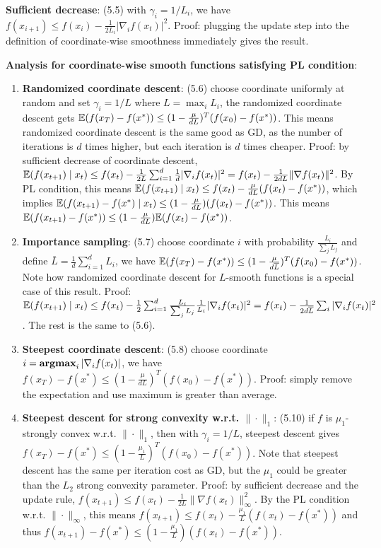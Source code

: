 \textbf{Sufficient decrease}: (5.5) with $\gamma_i = 1 / L_i$, we have $f(x_{i+1}) \le f(x_i) - \frac{1}{2L_i} |\nabla_i f(x_t)|^2$. Proof: plugging the update step into the definition of coordinate-wise smoothness immediately gives the result.

\textbf{Analysis for coordinate-wise smooth functions satisfying PL condition}:
\begin{enumerate}
    \item \textbf{Randomized coordinate descent}: (5.6) choose coordinate uniformly at random and set $\gamma_i = 1/L$ where $L = \max_i L_i$, the randomized coordinate descent gets $\mathbb{E}(f(x_T) - f(x^*)) \le (1-\frac{\mu}{d L})^T (f(x_0) - f(x^*))$. This means randomized coordinate descent is the same good as GD, as the number of iterations is $d$ times higher, but each iteration is $d$ times cheaper. Proof: by sufficient decrease of coordinate descent, $\mathbb{E} (f(x_{t+1}) \mid x_t) \le f(x_t) - \frac{1}{2L} \sum_{i=1}^d \frac{1}{d} |\nabla_i f(x_t)|^2 = f(x_t) - \frac{1}{2dL} \|\nabla f(x_t)\|^2$. By PL condition, this means $\mathbb{E} (f(x_{t+1}) \mid x_t) \le f(x_t) - \frac{\mu}{dL}(f(x_t) - f(x^*))$, which implies $\mathbb{E}(f(x_{t+1}) - f(x^*) \mid x_t) \le (1-\frac{\mu}{dL})(f(x_t) - f(x^*))$. This means $\mathbb{E}(f(x_{t+1}) - f(x^*)) \le (1-\frac{\mu}{dL})\mathbb{E}(f(x_t) - f(x^*))$.
    \item \textbf{Importance sampling}: (5.7) choose coordinate $i$ with probability $\frac{L_i}{\sum_j L_j}$ and define $\bar{L} = \frac{1}{d}\sum_{i=1}^d L_i$, we have $\mathbb{E}(f(x_T) - f(x^*)) \le (1-\frac{\mu}{d\overline{L}})^T (f(x_0) - f(x^*))$. Note how randomized coordinate descent for $L$-smooth functions is a special case of this result. Proof: $\mathbb{E} (f(x_{t+1}) \mid x_t) \le f(x_t) - \frac{1}{2} \sum_{i=1}^d \frac{L_i}{\sum_j L_j} \frac{1}{L_i} |\nabla_i f(x_t)|^2 = f(x_t) - \frac{1}{2d\overline{L}}\sum_i |\nabla_i f(x_t)|^2$. The rest is the same to (5.6).
    \item \textbf{Steepest coordinate descent}: (5.8) choose coordinate $i = \operatorname{\textbf{argmax}}_i |\nabla_i f(x_t)|$, we have $f(x_T) - f(x^*) \le (1-\frac{\mu}{d L})^T (f(x_0) - f(x^*))$. Proof: simply remove the expectation and use maximum is greater than average.
    \item \textbf{Steepest descent for strong convexity w.r.t. $\|\cdot\|_1$}: (5.10) if $f$ is $\mu_1$-strongly convex w.r.t. $\|\cdot\|_1$, then with $\gamma_i = 1/L$, steepest descent gives $f(x_T) - f(x^*) \le (1- \frac{\mu_1}{L})^T (f(x_0) - f(x^*))$. Note that steepest descent has the same per iteration cost as GD, but the $\mu_1$ could be greater than the $L_2$ strong convexity parameter. Proof: by sufficient decrease and the update rule, $f(x_{t+1}) \le f(x_t) - \frac{1}{2L}\|\nabla f(x_t)\|_\infty^2$. By the PL condition w.r.t. $\|\cdot\|_\infty$, this means $f(x_{t+1}) \le f(x_t) - \frac{\mu_1}{L} (f(x_t) - f(x^*))$ and thus $f(x_{t+1}) - f(x^*) \le (1- \frac{\mu_1}{L})(f(x_t) - f(x^*))$.

\end{enumerate}
